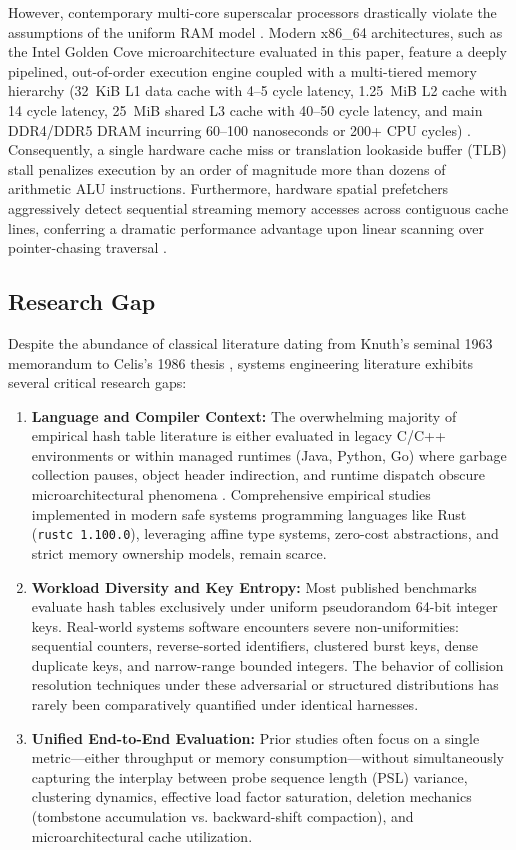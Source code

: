 \documentclass[conference]{IEEEtran}
\begin{document}
However, contemporary multi-core superscalar processors drastically violate the assumptions of the uniform RAM model \cite{vitter2001, richter2015}. Modern x86\_64 architectures, such as the Intel Golden Cove microarchitecture evaluated in this paper, feature a deeply pipelined, out-of-order execution engine coupled with a multi-tiered memory hierarchy (32~KiB L1 data cache with 4--5 cycle latency, 1.25~MiB L2 cache with 14 cycle latency, 25~MiB shared L3 cache with 40--50 cycle latency, and main DDR4/DDR5 DRAM incurring 60--100 nanoseconds or 200+ CPU cycles) \cite{fowler2019}. Consequently, a single hardware cache miss or translation lookaside buffer (TLB) stall penalizes execution by an order of magnitude more than dozens of arithmetic ALU instructions. Furthermore, hardware spatial prefetchers aggressively detect sequential streaming memory accesses across contiguous cache lines, conferring a dramatic performance advantage upon linear scanning over pointer-chasing traversal \cite{richter2015}.

\subsection{Research Gap}

Despite the abundance of classical literature dating from Knuth's seminal 1963 memorandum \cite{knuth1963} to Celis's 1986 thesis \cite{celis1986}, systems engineering literature exhibits several critical research gaps:
\begin{enumerate}
  \item \textbf{Language and Compiler Context:} The overwhelming majority of empirical hash table literature is either evaluated in legacy C/C++ environments or within managed runtimes (Java, Python, Go) where garbage collection pauses, object header indirection, and runtime dispatch obscure microarchitectural phenomena \cite{maier2019}. Comprehensive empirical studies implemented in modern safe systems programming languages like Rust (\texttt{rustc 1.100.0}), leveraging affine type systems, zero-cost abstractions, and strict memory ownership models, remain scarce.
  \item \textbf{Workload Diversity and Key Entropy:} Most published benchmarks evaluate hash tables exclusively under uniform pseudorandom 64-bit integer keys. Real-world systems software encounters severe non-uniformities: sequential counters, reverse-sorted identifiers, clustered burst keys, dense duplicate keys, and narrow-range bounded integers. The behavior of collision resolution techniques under these adversarial or structured distributions has rarely been comparatively quantified under identical harnesses.
  \item \textbf{Unified End-to-End Evaluation:} Prior studies often focus on a single metric---either throughput or memory consumption---without simultaneously capturing the interplay between probe sequence length (PSL) variance, clustering dynamics, effective load factor saturation, deletion mechanics (tombstone accumulation vs. backward-shift compaction), and microarchitectural cache utilization.
\end{enumerate}
\end{document}

